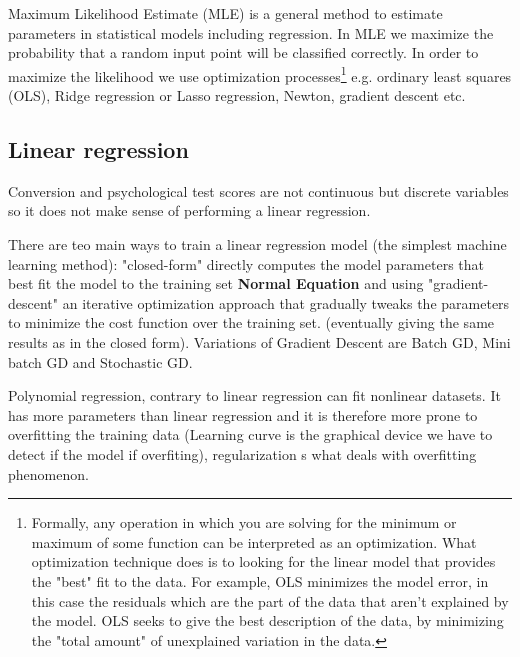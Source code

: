 \documentclass[12pt]{report}
\begin{document}
Maximum Likelihood Estimate (MLE) is a general method to estimate parameters in statistical models including regression. In MLE we maximize the probability that a random input point will be classified correctly. In order to maximize the likelihood we use optimization processes\footnote{Formally, any operation in which you are solving for the minimum or maximum of some function can be interpreted as an optimization. What optimization technique does is to looking for the linear model that provides the "best" fit to the data. For example, OLS minimizes the model error, in this case the residuals which are the part of the data that aren't explained by the model. OLS seeks to give the best description of the data, by minimizing the "total amount" of unexplained variation in the data.} e.g. ordinary least squares (OLS), Ridge regression or Lasso regression, Newton, gradient descent etc. 

\subsection{Linear regression}
Conversion and psychological test scores are not continuous but discrete variables so it does not make sense of performing a linear regression.

There are teo main ways to train a linear regression model (the simplest machine learning method): "closed-form" directly computes the model parameters that best fit the model to the training set \textbf{Normal Equation} and using "gradient-descent" an iterative optimization approach that gradually tweaks the parameters to minimize the cost function over the training set. (eventually giving the same results as in the closed form). Variations of Gradient Descent are Batch GD, Mini batch GD and Stochastic GD.

Polynomial regression, contrary to linear regression can fit nonlinear datasets. It has more parameters than linear regression and it is therefore more prone to overfitting the training data (Learning curve is the graphical device we have to detect if the model if overfiting), regularization s what deals with overfitting phenomenon.
\end{document}
